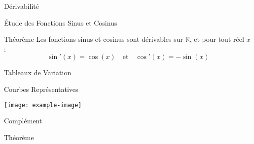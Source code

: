 \documentclass{cours}
\begin{document}
    \begin{Gpartie}{Dérivabilité} 
        \begin{Spartie}{Étude des Fonctions Sinus et Cosinus} 
            \begin{SSpartie}{Théorème} 
                Les fonctions sinus et cosinus sont dérivables sur $\mathbb{R}$, et pour tout réel $x$ : \[\sin'(x)=\cos(x)\quad\text{et}\quad\cos'(x)=-\sin(x)\]
            \end{SSpartie}
            \begin{SSpartie}{Tableaux de Variation} 
                \begin{center}
                    \parbox{\linewidth}{}
                \end{center}
            \end{SSpartie}
            \begin{SSpartie}{Courbes Représentatives} 
                \begin{center}
                        \texttt{[image: example-image]}
                    \parbox{\linewidth}{}
                \end{center}
            \end{SSpartie}
        \end{Spartie}
        \begin{Spartie}{Complément} 
            \begin{SSpartie}{Théorème} 

\end{SSpartie}
\end{Spartie}
\end{Gpartie}
\end{document}
